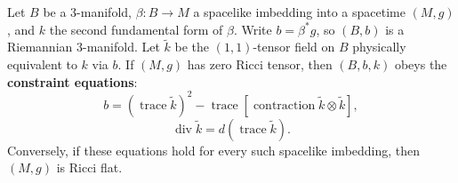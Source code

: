 Let $B$ be a 3-manifold, $\beta: B \to M$ a spacelike imbedding into a spacetime $(M, g)$, and $k$ the second fundamental form of $\beta$. Write $b = \beta^* g$, so $(B, b)$ is a Riemannian 3-manifold. Let $\tilde{k}$ be the $(1,1)$-tensor field on $B$ physically equivalent to $k$ via $b$. If $(M, g)$ has zero Ricci tensor, then $(B, b, k)$ obeys the \textbf{constraint equations}:
$$b = (\operatorname{trace} \tilde{k})^2 - \operatorname{trace}[\operatorname{contraction} \tilde{k} \otimes \tilde{k}],$$
$$\operatorname{div} \tilde{k} = d(\operatorname{trace} \tilde{k}).$$
Conversely, if these equations hold for every such spacelike imbedding, then $(M, g)$ is Ricci flat.
